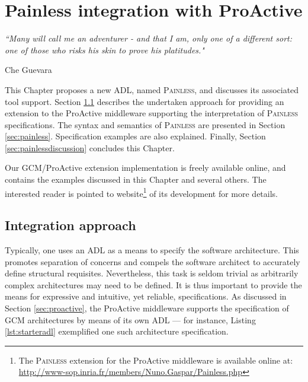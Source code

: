 
\chapter{\textsf{Painless} integration with ProActive} 
\label{chap:extraction} 


\epigraph{\textit{“Many will call me an adventurer - and that I am, only one of a different sort: 
                             one of those who risks his skin to prove his platitudes."}}{Che Guevara}



\minitoc



	This Chapter proposes a new \ac{ADL}, named \textsc{Painless}, and discusses its associated tool support.
	Section \ref{sec:painlessapproach} describes the undertaken approach for providing an
	extension to the ProActive middleware supporting the interpretation of 
	\textsc{Painless} specifications.
	The syntax and semantics of \textsc{Painless} are presented in Section \ref{sec:painless}. Specification
	examples are also explained. Finally, Section \ref{sec:painlessdiscussion} concludes this Chapter.

	Our GCM/ProActive extension implementation	 is freely available online, and contains
	the examples discussed in this Chapter and several others. The interested reader 
	is pointed to website\footnote{The \textsc{Painless} extension for the ProActive middleware
	is available online at: \url{http://www-sop.inria.fr/members/Nuno.Gaspar/Painless.php}} 
	of its development for more details.




\section{Integration approach}
\label{sec:painlessapproach}

	
		Typically, one uses an \ac{ADL} as a means to specify the 
	software architecture. This promotes separation of concerns
	and compels the software architect to accurately define structural requisites. Nevertheless,
	this task is seldom trivial as arbitrarily complex architectures may need to be defined.
	It is thus important to provide the means for expressive and intuitive, yet reliable, specifications.	
	As discussed in Section \ref{sec:proactive}, the ProActive middleware supports the specification
	of \ac{GCM} architectures by means of its own \ac{ADL} --- for instance, Listing \ref{lst:starteradl}
	exemplified one such architecture specification.
				
